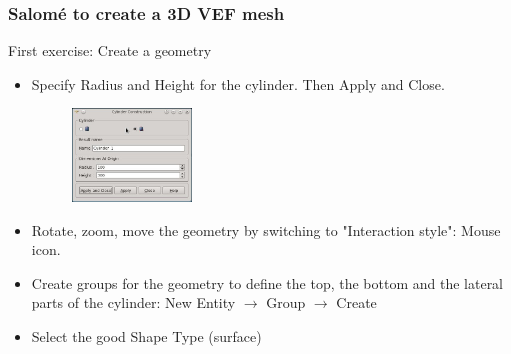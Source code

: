 \documentclass[10pt]{beamer}
\begin{document}
\begin{frame}
\frametitle{Salom\'e to create a 3D VEF mesh}
\begin{block}{First exercise: Create a geometry}

\begin{itemize}
\item Specify Radius and Height for the cylinder. Then Apply and Close.
\begin{figure}
\includegraphics[width=0.3\textwidth]{PICTURES/salome2.jpg}
\end{figure}

\item Rotate, zoom, move the geometry by switching to "Interaction style": Mouse icon.

\item Create groups for the geometry to define the top, the bottom and the lateral parts of the cylinder: New Entity $\rightarrow$ Group $\rightarrow$ Create

\item Select the good Shape Type (surface)
\end{itemize}

\end{block}
\end{frame}
\end{document}
